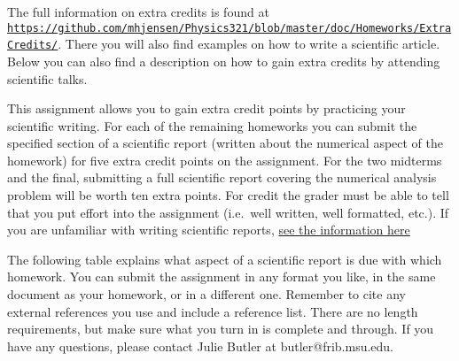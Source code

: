 \documentclass[%
oneside,                 %
final,                   %
10pt]{article}
\begin{document}
The full information on extra credits is found at \href{{https://github.com/mhjensen/Physics321/blob/master/doc/Homeworks/ExtraCredits/}}{\nolinkurl{https://github.com/mhjensen/Physics321/blob/master/doc/Homeworks/ExtraCredits/}}. There you will also find examples on how to write a scientific article. 
Below you can also find a description on how to gain extra credits by attending scientific talks.


This assignment allows you to gain extra credit points by practicing
your scientific writing.  For each of the remaining homeworks you can
submit the specified section of a scientific report (written about the
numerical aspect of the homework) for five extra credit points on the
assignment.  For the two midterms and the final, submitting a full
scientific report covering the numerical analysis problem will be
worth ten extra points.  For credit the grader must be able to tell
that you put effort into the assignment (i.e.~well written, well
formatted, etc.).  If you are unfamiliar with writing scientific
reports, \href{{https://github.com/mhjensen/Physics321/blob/master/doc/Homeworks/ExtraCredits/IntroductionScientificWriting.md}}{see the information here}

The following table explains what aspect of a scientific report is due
with which homework.  You can submit the assignment in any format you
like, in the same document as your homework, or in a different one.
Remember to cite any external references you use and include a
reference list.  There are no length requirements, but make sure what
you turn in is complete and through.  If you have any questions,
please contact Julie Butler at butler@frib.msu.edu.
\end{document}
